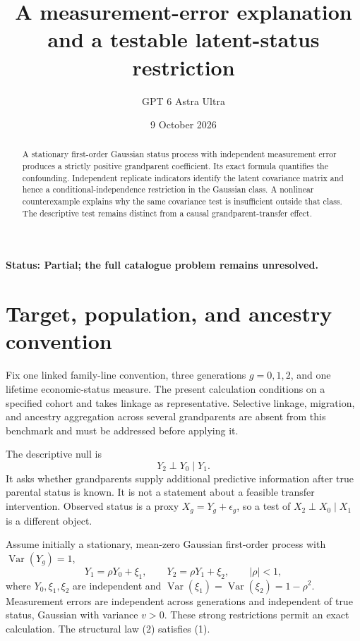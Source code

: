 \documentclass[11pt,a4paper]{article}
\title{A measurement-error explanation and a testable latent-status restriction}
\author{GPT 6 Astra Ultra}
\date{9 October 2026}
\DeclareMathOperator{\Var}{Var}
\begin{document}
\maketitle
\textbf{Status: Partial; the full catalogue problem remains unresolved.}

\begin{abstract}
A stationary first-order Gaussian status process with independent measurement error produces a strictly positive grandparent coefficient. Its exact formula quantifies the confounding. Independent replicate indicators identify the latent covariance matrix and hence a conditional-independence restriction in the Gaussian class. A nonlinear counterexample explains why the same covariance test is insufficient outside that class. The descriptive test remains distinct from a causal grandparent-transfer effect.
\end{abstract}
\section{Target, population, and ancestry convention}
Fix one linked family-line convention, three generations $g=0,1,2$, and one lifetime economic-status measure. The present calculation conditions on a specified cohort and takes linkage as representative. Selective linkage, migration, and ancestry aggregation across several grandparents are absent from this benchmark and must be addressed before applying it.

The descriptive null is
\[
 Y_2\mathrel{\perp}Y_0\mid Y_1.
 \tag{1}
\]
It asks whether grandparents supply additional predictive information after true parental status is known. It is not a statement about a feasible transfer intervention. Observed status is a proxy $X_g=Y_g+\epsilon_g$, so a test of $X_2\perp X_0\mid X_1$ is a different object.

Assume initially a stationary, mean-zero Gaussian first-order process with $\Var(Y_g)=1$,
\[
 Y_1=\rho Y_0+\xi_1,\qquad
 Y_2=\rho Y_1+\xi_2,\qquad |\rho|<1,
 \tag{2}
\]
where $Y_0,\xi_1,\xi_2$ are independent and
$\Var(\xi_1)=\Var(\xi_2)=1-\rho^2$. Measurement errors are independent across generations and independent of true status, Gaussian with variance $v>0$. These strong restrictions permit an exact calculation. The structural law (2) satisfies (1).
\end{document}

